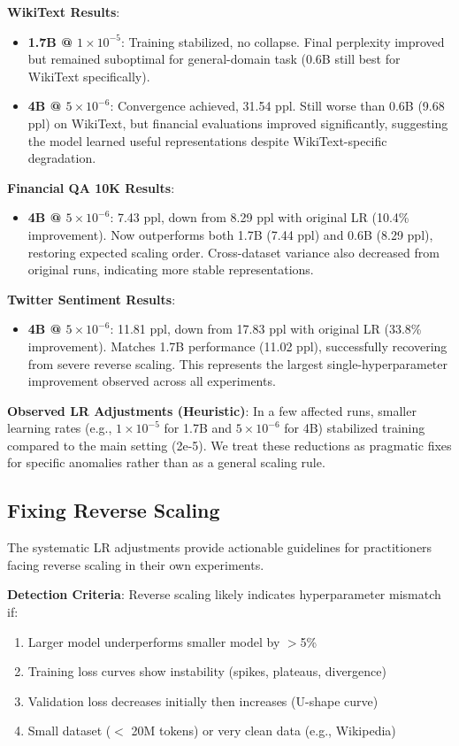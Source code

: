 \textbf{WikiText Results}:
\begin{itemize}
\item \textbf{1.7B @ $1 \times 10^{-5}$}: Training stabilized, no collapse. Final perplexity improved but remained suboptimal for general-domain task (0.6B still best for WikiText specifically).
\item \textbf{4B @ $5 \times 10^{-6}$}: Convergence achieved, 31.54 ppl. Still worse than 0.6B (9.68 ppl) on WikiText, but financial evaluations improved significantly, suggesting the model learned useful representations despite WikiText-specific degradation.
\end{itemize}

\textbf{Financial QA 10K Results}:
\begin{itemize}
\item \textbf{4B @ $5 \times 10^{-6}$}: 7.43 ppl, down from 8.29 ppl with original LR (10.4\% improvement). Now outperforms both 1.7B (7.44 ppl) and 0.6B (8.29 ppl), restoring expected scaling order. Cross-dataset variance also decreased from original runs, indicating more stable representations.
\end{itemize}

\textbf{Twitter Sentiment Results}:
\begin{itemize}
\item \textbf{4B @ $5 \times 10^{-6}$}: 11.81 ppl, down from 17.83 ppl with original LR (33.8\% improvement). Matches 1.7B performance (11.02 ppl), successfully recovering from severe reverse scaling. This represents the largest single-hyperparameter improvement observed across all experiments.
\end{itemize}

\textbf{Observed LR Adjustments (Heuristic)}: In a few affected runs, smaller learning rates (e.g., $1\times10^{-5}$ for 1.7B and $5\times10^{-6}$ for 4B) stabilized training compared to the main setting (2e-5). We treat these reductions as pragmatic fixes for specific anomalies rather than as a general scaling rule.

\subsection{Fixing Reverse Scaling}

The systematic LR adjustments provide actionable guidelines for practitioners facing reverse scaling in their own experiments.

\textbf{Detection Criteria}: Reverse scaling likely indicates hyperparameter mismatch if:
\begin{enumerate}
\item Larger model underperforms smaller model by $>$5\%
\item Training loss curves show instability (spikes, plateaus, divergence)
\item Validation loss decreases initially then increases (U-shape curve)
\item Small dataset ($<$ 20M tokens) or very clean data (e.g., Wikipedia)
\end{enumerate}

